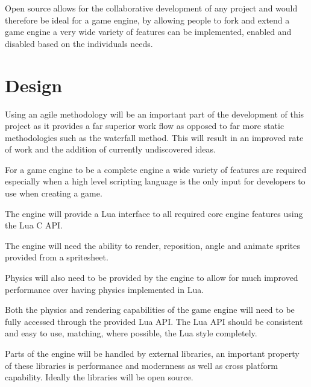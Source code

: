 \documentclass[11pt,a4paper,titlepage]{article}
\begin{document}
		Open source allows for the collaborative development of any project and would therefore be ideal for a game engine, by allowing people to fork and extend a game engine a very wide variety of features can be implemented, enabled and disabled based on the individuals needs.









\section{Design}


	Using an agile methodology will be an important part of the development of this project as it provides a far superior work flow as opposed to far more static methodologies such as the waterfall method. This will result in an improved rate of work and the addition of currently undiscovered ideas.


	For a game engine to be a complete engine a wide variety of features are required especially when a high level scripting language is the only input for developers to use when creating a game.

	The engine will provide a Lua interface to all required core engine features using the Lua C API.

	The engine will need the ability to render, reposition, angle and animate sprites provided from a spritesheet.

	Physics will also need to be provided by the engine to allow for much improved performance over having physics implemented in Lua.

	Both the physics and rendering capabilities of the game engine will need to be fully accessed through the provided Lua API. The Lua API should be consistent and easy to use, matching, where possible, the Lua style completely.


	Parts of the engine will be handled by external libraries, an important property of these libraries is performance and modernness as well as cross platform capability. Ideally the libraries will be open source.
\end{document}
